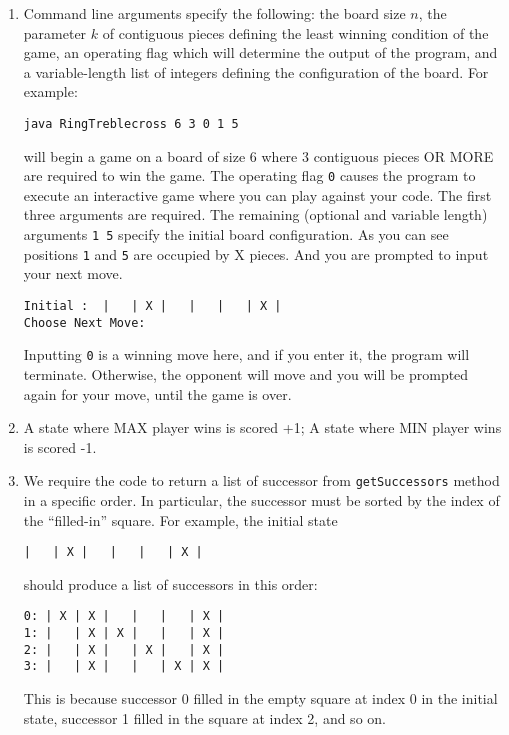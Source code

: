 \documentclass[10pt,a4paper]{article}
\begin{document}
\begin{enumerate}
\item Command line arguments specify the following: the board size $n$, the
  parameter $k$ of contiguous pieces defining the least winning condition of the game,
  an operating flag which will determine the output of the program, and a variable-length list of integers defining the
  configuration of the board. For example:
\begin{verbatim}
java RingTreblecross 6 3 0 1 5
\end{verbatim}
  will begin a game on a board of size 6 where 3 contiguous pieces OR MORE are required
  to win the game. The operating flag \texttt{0} causes the program to execute
  an interactive game where you can play against your code.
  The first three arguments are required. The remaining (optional and variable length)
  arguments \texttt{1 5} specify the initial board configuration. As you can see
  positions \texttt{1} and \texttt{5} are occupied by X pieces. And you are
  prompted to input your next move.

\begin{verbatim}
Initial :  |   | X |   |   |   | X |
Choose Next Move:
\end{verbatim}
  
  Inputting \texttt{0} is a winning move here, and if you enter it, the program
  will terminate. Otherwise, the opponent will move and you will be prompted
  again for your move, until the game is over.

\item A state where MAX player wins is scored +1;  A state where MIN player wins is scored -1.

\item We require the code to return a list of successor from \texttt{getSuccessors} method in a specific order.
In particular, the successor must be sorted by the index of the ``filled-in'' square.
For example, the initial state
\begin{verbatim}
|   | X |   |   |   | X |
\end{verbatim}
should produce a list of successors in this order: 
\begin{verbatim}
0: | X | X |   |   |   | X |
1: |   | X | X |   |   | X |
2: |   | X |   | X |   | X |
3: |   | X |   |   | X | X | 
\end{verbatim}
This is because successor 0 filled in the empty square at index 0 in the initial state, successor 1 filled in the square at index 2, and so on.


\end{enumerate}
\end{document}
